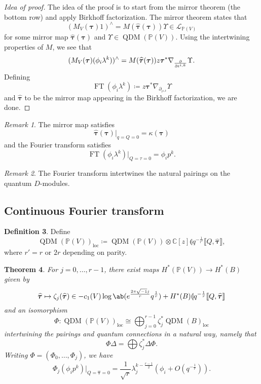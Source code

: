 \documentclass[leqno, openany]{memoir}
\newtheorem{thm}{Theorem}[section]
\theoremstyle{definition}
\newtheorem{defn}[thm]{Definition}
\theoremstyle{remark}
\newtheorem{rmk}[thm]{Remark}
\theoremstyle{plain}
\theoremstyle{definition}
\theoremstyle{remark}
\newcommand{\C}{\mathbb{C}}
\renewcommand{\P}{\mathbb{P}}
\newcommand{\mc}[1]{\mathcal{#1}}
\newcommand{\mr}[1]{\mathrm{#1}}
\newcommand{\on}[1]{\operatorname{#1}}
\newcommand{\wh}[1]{\widehat{#1}}
\DeclareMathOperator{\QDM}{QDM}
\begin{document}
\begin{proof}[Idea of proof]
    The idea of the proof is to start from the mirror theorem (the bottom row) and apply Birkhoff factorization. The mirror theorem states that
    \[ (M_V(\bm{\tau}) 1)^{\wedge} = M(\wh{\bm{\tau}}(\bm{\tau})) \Upsilon \in \mc{L}_{\P(V)} \]
    for some mirror map $\wh{\bm{\tau}}(\bm{\tau})$ and $\Upsilon \in \QDM(\P(V))$. Using the intertwining properties of $M$, we see that
    \[ (M_V(\bm{\tau})(\phi_i \lambda^k))^{\wedge} = M(\wh{\bm{\tau}}(\bm{\tau})) z \bm{\tau}^* \nabla_{\pdv{}{t^{i,k}}} \Upsilon. \]
    Defining
    \[ \on{FT}(\phi_i \lambda^k) \coloneqq z \bm{\tau}^* \nabla_{\partial_{\tau^{i,k}}} \Upsilon \]
    and $\wh{\bm{\tau}}$ to be the mirror map appearing in the Birkhoff factorization, we are done.
\end{proof}

\begin{rmk}
    The mirror map satisfies
    \[ \wh{\bm{\tau}}(\bm{\tau})|_{q=Q=0} = \kappa(\bm{\tau}) \]
    and the Fourier transform satisfies
    \[ \on{FT}(\phi_i \lambda^k)|_{Q=\tau=0} = \phi_i p^k. \]
\end{rmk}

\begin{rmk}
    The Fourier transform intertwines the natural pairings on the quantum $D$-modules.
\end{rmk}


\subsection{Continuous Fourier transform}%
\label{sub:Continuous Fourier transform}

\begin{defn}
    Define
    \[ \QDM(\P(V))_{\mr{loc}} \coloneqq \QDM(\P(V)) \otimes \C[z] \llparenthesis q^{-\frac{1}{r'}} \llbracket Q,\wh{\bm{\tau}} \rrbracket ,\]
    where $r' = r \text{ or } 2r$ depending on parity.
\end{defn}

\begin{thm}
    For $j = 0,\ldots,r-1$, there exist maps $H^*(\P(V)) \to H^*(B)$ given by
    \[ \wh{\bm{\tau}} \mapsto \zeta_j(\wh{\bm{\tau}}) \in -c_1(V) \log \ab( e^{\frac{2\pi \sqrt{-1} j}{r}} q^{\frac{1}{r}} ) + H^*(B) \llparenthesis q^{-\frac{1}{r}} \llbracket Q,\wh{\bm{\tau}} \rrbracket \]
    and an isomorphism 
    \[ \Phi \colon \QDM(\P(V))_{\mr{loc}} \cong \bigoplus_{j=0}^{r-1} \zeta_j^* \QDM(B)_{\mr{loc}} \]
    intertwining the pairings and quantum connections in a natural way, namely that
    \[ \Phi \Delta = \bigoplus \zeta_j^* \Delta \Phi. \]
    Writing $\Phi = (\Phi_0, \ldots, \Phi_j)$, we have
    \[ \Phi_j (\phi_i p^k)|_{Q = \wh{\bm{\tau}} = 0} = \frac{1}{\sqrt{r}} \lambda_j^{k-\frac{r-1}{2}}(\phi_i + O(q^{-\frac{1}{r}})). \]
\end{thm}
\end{document}
